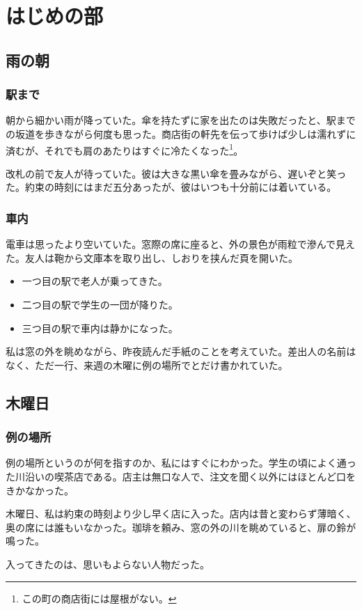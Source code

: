 \documentclass[a5paper]{ltjsbook}
\begin{document}
\part{はじめの部}
\chapter{雨の朝}
\section{駅まで}
朝から細かい雨が降っていた。傘を持たずに家を出たのは失敗だったと、駅までの坂道を歩きながら何度も思った。商店街の軒先を伝って歩けば少しは濡れずに済むが、それでも肩のあたりはすぐに冷たくなった\footnote{この町の商店街には屋根がない。}。

改札の前で友人が待っていた。彼は大きな黒い傘を畳みながら、遅いぞと笑った。約束の時刻にはまだ五分あったが、彼はいつも十分前には着いている。

\section{車内}
電車は思ったより空いていた。窓際の席に座ると、外の景色が雨粒で滲んで見えた。友人は鞄から文庫本を取り出し、しおりを挟んだ頁を開いた。
\begin{itemize}
\item 一つ目の駅で老人が乗ってきた。
\item 二つ目の駅で学生の一団が降りた。
\item 三つ目の駅で車内は静かになった。
\end{itemize}
私は窓の外を眺めながら、昨夜読んだ手紙のことを考えていた。差出人の名前はなく、ただ一行、来週の木曜に例の場所でとだけ書かれていた。

\chapter{木曜日}
\section{例の場所}
例の場所というのが何を指すのか、私にはすぐにわかった。学生の頃によく通った川沿いの喫茶店である。店主は無口な人で、注文を聞く以外にはほとんど口をきかなかった。

木曜日、私は約束の時刻より少し早く店に入った。店内は昔と変わらず薄暗く、奥の席には誰もいなかった。珈琲を頼み、窓の外の川を眺めていると、扉の鈴が鳴った。

入ってきたのは、思いもよらない人物だった。
\end{document}
